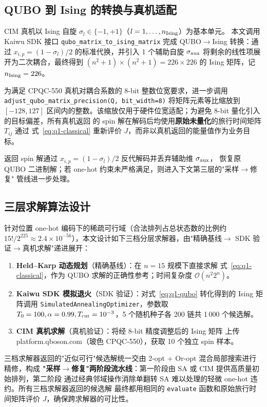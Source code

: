 \documentclass[UTF8,12pt,a4paper]{ctexart}
\begin{document}
\subsection{QUBO 到 Ising 的转换与真机适配}

CIM 真机以 Ising 自旋 $\sigma_{l}\in\{-1,+1\}$（$l=1,\dots,n_{\rm Ising}$）为基本单元。
本文调用 Kaiwu SDK 接口 \texttt{qubo\_matrix\_to\_ising\_matrix} 完成 QUBO$\to$Ising
转换：通过 $x_{i,p}=(1-\sigma_{l})/2$ 的标准代换，并引入 1 个辅助自旋 $\sigma_{\rm aux}$
将剩余的线性项展开为二次耦合，最终得到 $(n^{2}+1)\times(n^{2}+1)=226\times 226$ 的 Ising
矩阵，记 $n_{\rm Ising}=226$。

为满足 CPQC-550 真机对耦合系数的 8-bit 整数位宽要求，进一步调用
\texttt{adjust\_qubo\_matrix\_precision(Q, bit\_width=8)} 将矩阵元素等比缩放到 $[-128,127]$
区间内的整数。该缩放仅用于硬件位宽适配；为避免 8-bit 量化引入的目标偏差，所有真机返回
的 spin 解在解码后均使用\textbf{原始未量化}的旅行时间矩阵 $T_{ij}$ 通过
式~\eqref{eq:q1-classical} 重新评价 $J$，而非以真机返回的能量值作为业务目标。

返回 spin 解通过 $x_{i,p}=(1-\sigma_{l})/2$ 反代解码并丢弃辅助维 $\sigma_{\rm aux}$，
恢复原 QUBO 二进制解；若 one-hot 约束未严格满足，则进入下文第三层的"采样$\to$修复"
管线进一步处理。

\subsection{三层求解算法设计}
\label{subsec:q1-algo}

针对位置 one-hot 编码下的稀疏可行域（合法排列占总状态数的比例约
$15!/2^{225}\!\approx\!2.4\times 10^{-56}$），本文设计如下三档分层求解器，由"精确基线$\to$
SDK 验证$\to$真机求解"递进展开：
\begin{enumerate}
  \item[(i)] \textbf{Held--Karp 动态规划}（精确基线）：在 $n=15$ 规模下直接求解
    式~\eqref{eq:q1-classical}，作为 QUBO 求解的正确性参考；时间复杂度 $\mathcal{O}(n^{2}2^{n})$。
  \item[(ii)] \textbf{Kaiwu SDK 模拟退火}（SDK 验证）：对式~\eqref{eq:q1-qubo} 转化得到的
    Ising 矩阵调用 \texttt{SimulatedAnnealingOptimizer}，参数取 $T_{0}=100,\alpha=0.99,
    T_{\rm cut}=10^{-3}$，5 个随机种子各 200 链共 1\,000 个候选解。
  \item[(iii)] \textbf{CIM 真机求解}（真机验证）：将经 8-bit 精度调整后的 Ising 矩阵
    上传 platform.qboson.com（玻色 CPQC-550），获取 10 个独立 spin 样本。
\end{enumerate}
三档求解器返回的"近似可行"候选解统一交由 2-opt $+$ Or-opt 混合局部搜索进行精修，构成
\textbf{"采样$\to$修复"两阶段流水线}：第一阶段由 SA 或 CIM 提供高质量初始排列，第二阶段
通过经典邻域操作消除单翻转 SA 难以处理的轻微 one-hot 违约。所有三档求解器返回的候选解
最终都用相同的 \texttt{evaluate} 函数和原始旅行时间矩阵评价 $J$，确保跨求解器的可比性。
\end{document}
